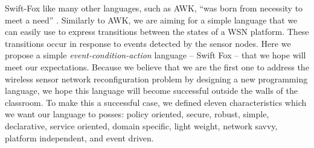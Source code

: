 Swift-Fox like many other languages, such as AWK, ``was born from necessity
to meet a need'' \cite{aho:2008}. Similarly to AWK, we are aiming for a
simple language that we can easily use to express transitions between the
states of a WSN platform. These transitions occur in response to events
detected by the sensor nodes. Here we propose a simple
\textit{event-condition-action} language -- Swift Fox -- that we hope
will meet our expectations. Because we believe that we are the first one to
address the wireless sensor network reconfiguration problem by designing
a new programming language, we hope this language will become successful
outside the walls of the classroom. To make this a successful case, we
defined eleven characteristics which we want our language to posses: policy
oriented, secure, robust, simple, declarative, service oriented, 
domain specific, light weight, network savvy, platform independent, 
and event driven.


